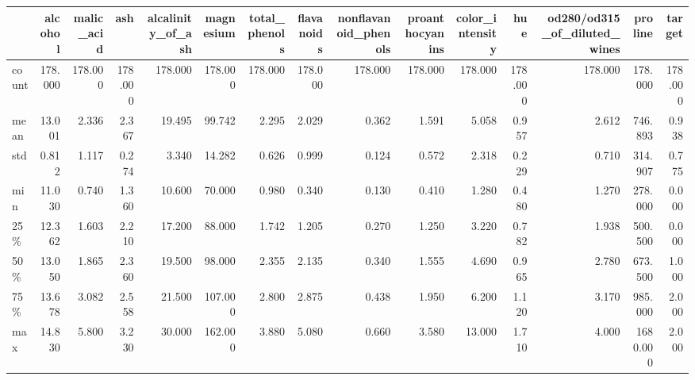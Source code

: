 \begin{tabular}{lrrrrrrrrrrrrrr}
\toprule
{} &  alcohol &  malic\_acid &      ash &  alcalinity\_of\_ash &  magnesium &  total\_phenols &  flavanoids &  nonflavanoid\_phenols &  proanthocyanins &  color\_intensity &      hue &  od280/od315\_of\_diluted\_wines &   proline &   target \\
\midrule
count &  178.000 &     178.000 &  178.000 &            178.000 &    178.000 &        178.000 &     178.000 &               178.000 &          178.000 &          178.000 &  178.000 &                       178.000 &   178.000 &  178.000 \\
mean  &   13.001 &       2.336 &    2.367 &             19.495 &     99.742 &          2.295 &       2.029 &                 0.362 &            1.591 &            5.058 &    0.957 &                         2.612 &   746.893 &    0.938 \\
std   &    0.812 &       1.117 &    0.274 &              3.340 &     14.282 &          0.626 &       0.999 &                 0.124 &            0.572 &            2.318 &    0.229 &                         0.710 &   314.907 &    0.775 \\
min   &   11.030 &       0.740 &    1.360 &             10.600 &     70.000 &          0.980 &       0.340 &                 0.130 &            0.410 &            1.280 &    0.480 &                         1.270 &   278.000 &    0.000 \\
25\%   &   12.362 &       1.603 &    2.210 &             17.200 &     88.000 &          1.742 &       1.205 &                 0.270 &            1.250 &            3.220 &    0.782 &                         1.938 &   500.500 &    0.000 \\
50\%   &   13.050 &       1.865 &    2.360 &             19.500 &     98.000 &          2.355 &       2.135 &                 0.340 &            1.555 &            4.690 &    0.965 &                         2.780 &   673.500 &    1.000 \\
75\%   &   13.678 &       3.082 &    2.558 &             21.500 &    107.000 &          2.800 &       2.875 &                 0.438 &            1.950 &            6.200 &    1.120 &                         3.170 &   985.000 &    2.000 \\
max   &   14.830 &       5.800 &    3.230 &             30.000 &    162.000 &          3.880 &       5.080 &                 0.660 &            3.580 &           13.000 &    1.710 &                         4.000 &  1680.000 &    2.000 \\
\bottomrule
\end{tabular}
